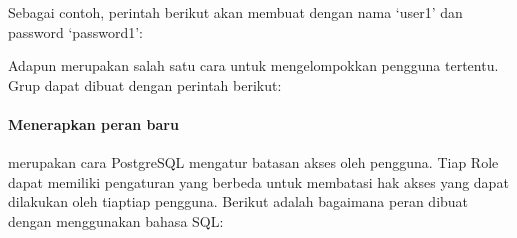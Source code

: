\documentclass[letterpaper,10pt,english]{sphinxmanual}
\begin{document}
\begin{sphinxVerbatim}[commandchars=\\\{\}]
    \PYG{p}{[} \PYG{p}{[}  \PYG{p}{]} 
     
    \PYG{p}{[}    \PYG{p}{]}  
      
      
       \PYG{p}{[} \PYG{p}{]}
       \PYG{p}{]}
\end{sphinxVerbatim}

Sebagai contoh, perintah berikut akan membuat  dengan nama ‘user1’ dan password ‘password1’:

\begin{sphinxVerbatim}[commandchars=\\\{\}]
     
\end{sphinxVerbatim}

Adapun  merupakan salah satu cara untuk mengelompokkan pengguna tertentu. Grup dapat dibuat dengan perintah berikut:

\begin{sphinxVerbatim}[commandchars=\\\{\}]
     
\end{sphinxVerbatim}


\paragraph{Menerapkan peran baru}
\label{\detokenize{sesi2/dbmanagement:menerapkan-peran-baru}}
 merupakan cara PostgreSQL mengatur batasan akses oleh pengguna. Tiap Role dapat memiliki pengaturan  yang berbeda untuk membatasi hak akses yang dapat dilakukan oleh tiap\sphinxhyphen{}tiap pengguna. Berikut adalah bagaimana peran dibuat dengan menggunakan bahasa SQL:

\begin{sphinxVerbatim}[commandchars=\\\{\}]
      
\end{sphinxVerbatim}
\end{document}
